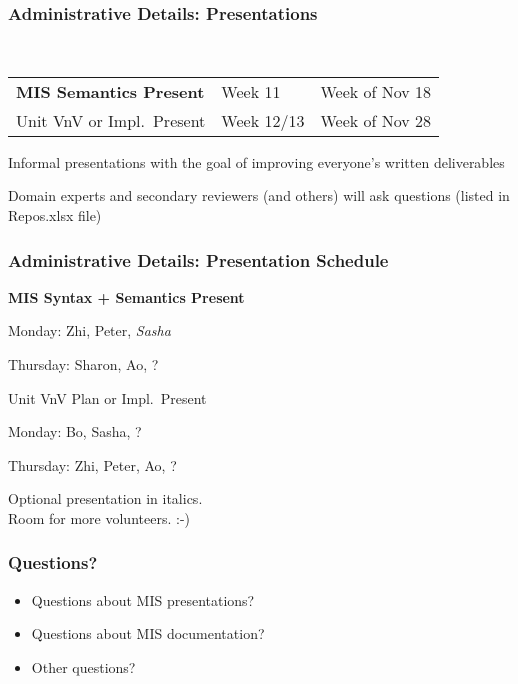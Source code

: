 \documentclass[t,12pt,numbers,fleqn,handout]{beamer}
\begin{document}

\begin{frame}
\frametitle{Administrative Details: Presentations}

~\newline
\begin{tabular}{l l l}
\textbf{MIS Semantics Present} & Week 11 & Week of Nov 18\\
Unit VnV or Impl.\ Present & Week 12/13 & Week of Nov 28\\
\end {tabular}

\bi
\item Informal presentations with the goal of improving everyone's written
  deliverables
\item Domain experts and secondary reviewers (and others) will ask questions
  (listed in Repos.xlsx file)
\ei

\end{frame}


\begin{frame}
\frametitle{Administrative Details: Presentation Schedule}

\bi
\item \textbf{MIS Syntax + Semantics Present}
\bi
\item Monday: Zhi, Peter, \emph{Sasha}
\item Thursday:  Sharon, Ao, ?
\ei
\item Unit VnV Plan or Impl.\ Present
\bi
\item Monday: Bo, Sasha, ?
\item Thursday: Zhi, Peter, Ao, ?
\ei
\ei

Optional presentation in italics.\\
Room for more volunteers.  :-)

\end{frame}


\begin{frame}
\frametitle{Questions?}
\begin{itemize}
\item Questions about MIS presentations?
\item Questions about MIS documentation?
\item Other questions?
\end{itemize}
\end{frame}
\end{document}
